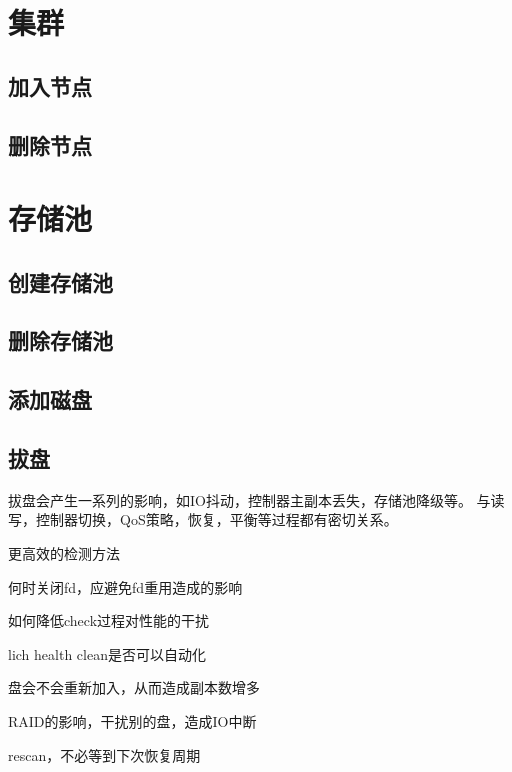 \section{集群}

\subsection{加入节点}
\subsection{删除节点}

\section{存储池}

\subsection{创建存储池}

\subsection{删除存储池}

\subsection{添加磁盘}


\subsection{拔盘}

拔盘会产生一系列的影响，如IO抖动，控制器主副本丢失，存储池降级等。
与读写，控制器切换，QoS策略，恢复，平衡等过程都有密切关系。

\begin{compactenum}
\item 更高效的检测方法
\item 何时关闭fd，应避免fd重用造成的影响
\item 如何降低check过程对性能的干扰
\item lich health clean是否可以自动化
\item 盘会不会重新加入，从而造成副本数增多
\item RAID的影响，干扰别的盘，造成IO中断
\item rescan，不必等到下次恢复周期
\end{compactenum}


